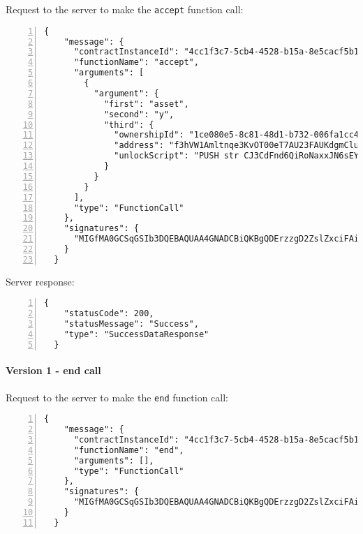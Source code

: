 Request to the server to make the \verb|accept| function call:
\begin{Verbatim}[numbers=left,xleftmargin=1cm,firstnumber=1,breaklines=true,breakanywhere=true,tabsize=2]
  {
    "message": {
      "contractInstanceId": "4cc1f3c7-5cb4-4528-b15a-8e5cacf5b18a",
      "functionName": "accept",
      "arguments": [
        {
          "argument": {
            "first": "asset",
            "second": "y",
            "third": {
              "ownershipId": "1ce080e5-8c81-48d1-b732-006fa1cc4e2e",
              "address": "f3hVW1Amltnqe3KvOT00eT7AU23FAUKdgmCluZB+nss=",
              "unlockScript": "PUSH str CJ3CdFnd6QiRoNaxxJN6sEYkmhKsSKi0SP5YXiSGhygZs+EMyE2bPrI+hRL4PSA0vLh0X6PNpDhTaPxx4kc1LEk9su8+6kkDvi3xpLG9bDoPjss+LEPXUjPTcGVB/3jITb8W+GmX1kDYhGHKtSuhvxBjTwwbtok4gRDD1BcMX/o=\nPUSH str MIGfMA0GCSqGSIb3DQEBAQUAA4GNADCBiQKBgQDErzzgD2ZslZxciFAiX3/ot7lrkZDw4148jFZrsDZPE6CVs9xXFSHGgy/mFvIFLXhnChO6Nyd2be3lbgeavLMCMVUiTStXr117Km17keWpb3sItkKKsLFBOcIIU8XXowI/OhzQN2XPZYESHgjdQ5vwEj2YyueiS7WKP94YWz/pswIDAQAB\n"
            }
          }
        }
      ],
      "type": "FunctionCall"
    },
    "signatures": {
      "MIGfMA0GCSqGSIb3DQEBAQUAA4GNADCBiQKBgQDErzzgD2ZslZxciFAiX3/ot7lrkZDw4148jFZrsDZPE6CVs9xXFSHGgy/mFvIFLXhnChO6Nyd2be3lbgeavLMCMVUiTStXr117Km17keWpb3sItkKKsLFBOcIIU8XXowI/OhzQN2XPZYESHgjdQ5vwEj2YyueiS7WKP94YWz/pswIDAQAB": "wL3r61IgwBGau7S7V967ZSA8B0lLiOMi0qai1YGQVFXnCTvL9WDVMGTwp7XXAQ77f23Hw5y6Ho5SFUMRRfaTLguIJBx9twRSUfpTP4bh3K4RB2yg32rkOP16G2vIfEirTT+v2wmp1f10pY+dY/QdMzua7EFdQNmL7PhJnA96CpM="
    }
  }
\end{Verbatim}

Server response:
\begin{Verbatim}[numbers=left,xleftmargin=1cm,firstnumber=1,breaklines=true,breakanywhere=true,tabsize=2]
  {
    "statusCode": 200,
    "statusMessage": "Success",
    "type": "SuccessDataResponse"
  }
\end{Verbatim}

\paragraph{Version 1 - end call}

Request to the server to make the \verb|end| function call:
\begin{Verbatim}[numbers=left,xleftmargin=1cm,firstnumber=1,breaklines=true,breakanywhere=true,tabsize=2]
  {
    "message": {
      "contractInstanceId": "4cc1f3c7-5cb4-4528-b15a-8e5cacf5b18a",
      "functionName": "end",
      "arguments": [],
      "type": "FunctionCall"
    },
    "signatures": {
      "MIGfMA0GCSqGSIb3DQEBAQUAA4GNADCBiQKBgQDErzzgD2ZslZxciFAiX3/ot7lrkZDw4148jFZrsDZPE6CVs9xXFSHGgy/mFvIFLXhnChO6Nyd2be3lbgeavLMCMVUiTStXr117Km17keWpb3sItkKKsLFBOcIIU8XXowI/OhzQN2XPZYESHgjdQ5vwEj2YyueiS7WKP94YWz/pswIDAQAB": "hU6i0eGRNcZB+ZCxeLCPBM31iai412yczQ4/Td+roq9jnBU7agWfuOyVl/6fCKdTZcKkxASJs1tCpe4bLlpUHt01lFlGM8n9+sPHXl+1/jXMngmmPhuNUPrtsD7PGeFtuC3JJkcqTq3WkyWz6nVdn55bzX6BxleN/I6MPgmDroc="
    }
  }
\end{Verbatim}

